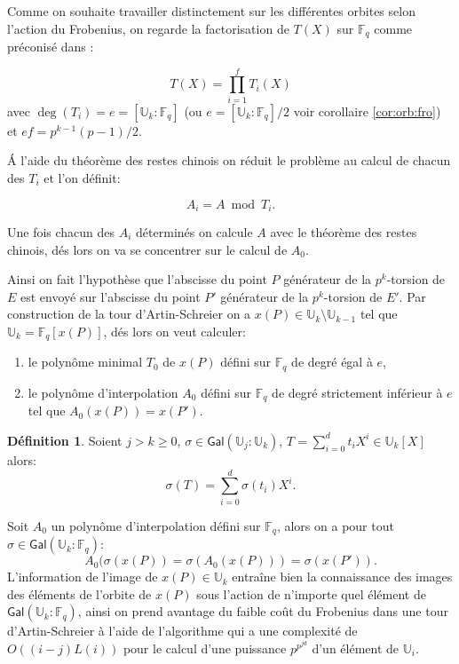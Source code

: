 \documentclass[10pt,a4paper]{book}
\theoremstyle{plain}
\theoremstyle{definition}
\theoremstyle{definition}
\theoremstyle{definition}
\theoremstyle{definition}
\newtheorem{defi}[thm]{Définition}
\theoremstyle{remark}
\theoremstyle{remark}
\theoremstyle{definition}
\begin{document}
Comme on souhaite travailler distinctement sur les différentes orbites selon l'action du Frobenius, on regarde la factorisation de $T(X)$ sur $\mathbb{F}_q$ comme préconisé dans \cite{Couveignes96}:

\begin{equation*}
T(X)=\prod_{i=1}^fT_{i}(X)
\end{equation*}
avec $\deg(T_i)=e=[\mathbb{U}_k:\mathbb{F}_q]$ (ou $e=[\mathbb{U}_k:\mathbb{F}_q]/2$ voir corollaire \ref{cor:orb:fro}) et $ef=p^{k-1}(p-1)/2$.

\'A l'aide du théorème des restes chinois on réduit le problème au calcul de chacun des $T_{i}$ et l'on définit:

\begin{equation}
A_{i}=A \bmod{T_{i}}.
\end{equation}

Une fois chacun des $A_{i}$ déterminés on calcule $A$ avec le théorème des restes chinois, dés lors on va se concentrer sur le calcul de $A_{0}$.


Ainsi on fait l'hypothèse que l'abscisse du point $P$ générateur de la $p^k$-torsion de $E$ est envoyé sur l'abscisse du point $P'$ générateur de la $p^k$-torsion de $E'$. Par construction de la tour d'Artin-Schreier on a $x(P) \in \mathbb{U}_k \setminus \mathbb{U}_{k-1}$ tel que $\mathbb{U}_k=\mathbb{F}_q[x(P)]$, dés lors on veut calculer: 
\begin{enumerate}
\item le polynôme minimal $T_{0}$ de $x(P)$ défini sur $\mathbb{F}_q$ de degré égal à $e$,
\item le polynôme d'interpolation $A_0$ défini sur $\mathbb{F}_q$ de degré strictement inférieur à $e$ tel que $A_0(x(P))=x(P')$.
\end{enumerate}

\begin{defi}
Soient $j > k \geqslant 0$, $\sigma \in \mathsf{Gal}(\mathbb{U}_j:\mathbb{U}_k)$, $T=\sum_{i=0}^{d}t_iX^i \in \mathbb{U}_k[X]$ alors:
\[
\sigma(T)=\sum_{i=0}^{d}\sigma(t_i)X^i.
\]   
\end{defi}

Soit $A_0$ un polynôme d'interpolation défini sur $\mathbb{F}_q$, alors on a pour tout $\sigma \in \mathsf{Gal}(\mathbb{U}_k:\mathbb{F}_q)$:
\begin{equation*}
A_0(\sigma(x(P))=\sigma(A_0(x(P)))=\sigma(x(P')).
\end{equation*}
L'information de l'image de $x(P) \in \mathbb{U}_k$ entraîne bien la connaissance des images des éléments de l'orbite de $x(P)$ sous l'action de n'importe quel élément de $\mathsf{Gal}(\mathbb{U}_k:\mathbb{F}_q)$, ainsi on prend avantage du faible coût du Frobenius dans une tour d'Artin-Schreier à l'aide de l'algorithme \cite[Iter Frobenius,Theorem 17 et 18]{DeFeo-Shost'12} qui a une complexité de $O((i-j)L(i))$ pour le calcul d'une puissance $p^{p^{jd}}$ d'un élément de $\mathbb{U}_i$.
\end{document}
